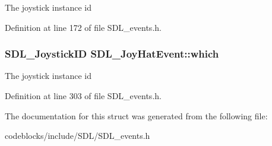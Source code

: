 The joystick instance id 

Definition at line 172 of file S\+D\+L\+\_\+events.\+h.

\hypertarget{structSDL__JoyHatEvent_ac9d9bb179f9116d16b3da47cacd74b55}{
\subsubsection[{which}]{\setlength{\rightskip}{0pt plus 5cm}S\+D\+L\+\_\+\+Joystick\+I\+D S\+D\+L\+\_\+\+Joy\+Hat\+Event\+::which}}\label{structSDL__JoyHatEvent_ac9d9bb179f9116d16b3da47cacd74b55}
The joystick instance id 

Definition at line 303 of file S\+D\+L\+\_\+events.\+h.



The documentation for this struct was generated from the following file\+:\begin{DoxyCompactItemize}
\item 
codeblocks/include/\+S\+D\+L/S\+D\+L\+\_\+events.\+h\end{DoxyCompactItemize}
